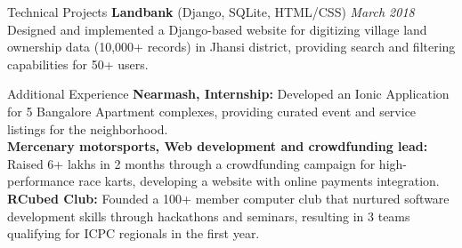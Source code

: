 \documentclass{resume} %
\begin{document}
\begin{rSection}{Technical Projects}
{\bf Landbank} (Django, SQLite, HTML/CSS) \hfill {\em  March 2018}
\\Designed and implemented a Django-based website for digitizing village land ownership data (10,000+ records) in Jhansi district, providing search and filtering capabilities for 50+ users.

\end{rSection}



\begin{rSection}{Additional Experience} 
{\bf Nearmash, Internship:} Developed an Ionic Application for 5 Bangalore Apartment complexes, providing curated event and service listings for the neighborhood.
\\{\bf Mercenary motorsports, Web development and crowdfunding lead:} Raised 6+ lakhs in 2 months through a crowdfunding campaign for high-performance race karts, developing a website with online payments integration.
\\{\bf RCubed Club:} Founded a 100+ member computer club that nurtured software development skills through hackathons and seminars, resulting in 3 teams qualifying for ICPC regionals in the first year.
\end{rSection}
\end{document}
